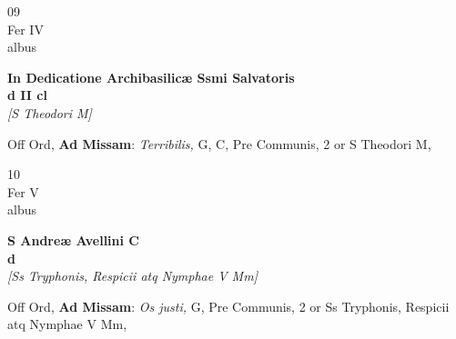 \documentclass[10pt, openany]{book}
\begin{document}
        \begin{center}
            \begin{minipage}{3.5in}
                \vspace{2em}
                \begin{minipage}{0.5in}
                    {\Huge 09} \\
                    {\normalsize Fer IV} \\
                    {\normalsize albus}
                \end{minipage}
                \begin{minipage}{3.0in}
                    \textbf{ \large In Dedicatione Archibasilicæ Ssmi Salvatoris \\
                    \textnormal{\normalsize d II cl}} \\ \textit{[S Theodori M]} \\ 
                \end{minipage}
                \begin{justify}Off Ord, \textbf{Ad Missam}: \textit{Terribilis,} G, C, Pre Communis, 2 or S Theodori M,   
                \end{justify}
            \end{minipage}
        \end{center}
    
        \begin{center}
            \begin{minipage}{3.5in}
                \vspace{2em}
                \begin{minipage}{0.5in}
                    {\Huge 10} \\
                    {\normalsize Fer V} \\
                    {\normalsize albus}
                \end{minipage}
                \begin{minipage}{3.0in}
                    \textbf{ \large S Andreæ Avellini C \\
                    \textnormal{\normalsize d}} \\ \textit{[Ss Tryphonis, Respicii atq Nymphae V Mm]} \\ 
                \end{minipage}
                \begin{justify}Off Ord, \textbf{Ad Missam}: \textit{Os justi,} G, Pre Communis, 2 or Ss Tryphonis, Respicii atq Nymphae V Mm,   
                \end{justify}
            \end{minipage}
        \end{center}
    
\end{document}
